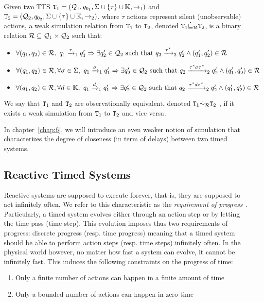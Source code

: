 \begin{definition}\label{def:wsim}
  Given two TTS $\texttt{T}_{1}=(\mathcal{Q}_{1},q_{0_{1}},\Sigma \cup\{\tau\}\cup\mathbb{K},\to_{1})$ and $\texttt{T}_{2}=(\mathcal{Q}_{2},q_{0_{2}},\Sigma \cup\{\tau\}\cup\mathbb{K},\to_{2})$, where $\tau$ actions 
  represent silent (unobservable) actions, a weak simulation relation from 
  $\texttt{T}_{1}$ to $\texttt{T}_{2}$, denoted $\texttt{T}_{1}\dot{\sqsubseteq}_{\mathcal{R}}\texttt{T}_{2}$, 
  is a binary relation $\mathcal{R}\subseteq\mathcal{Q}_1
  \times\mathcal{Q}_2$ such that:
  \begin{itemize}
    \item $\forall(q_1,q_2)\in\mc{R},\ 
      q_1\transitb{\tau}{1}q_1'\Rightarrow\exists q'_2\in\mc{Q}_2 
      \text{ such that } q_2\transitb{\tau^*}{2}q_2'\wedge
      (q_1',q_2')\in\mc{R}$
    \item $\forall(q_1,q_2)\in\mc{R},\forall\sigma\in\Sigma,\ 
      q_1\transitb{\sigma}{1}q_1'\Rightarrow\exists q'_2\in\mc{Q}_2 
      \text{ such that } q_2\transitb{\tau^*\sigma\tau^*}{2}q_2'\wedge
      (q_1',q_2')\in\mc{R}$
    \item $\forall(q_1,q_2)\in\mc{R},\forall d\in\mb{K},\ 
      q_1\transitb{d}{1}q_1'\Rightarrow\exists q'_2\in\mc{Q}_2 
      \text{ such that } q_2\transitb{\tau^*d\tau^*}{2}q_2'\wedge
      (q_1',q_2')\in\mc{R}$
  \end{itemize}
\end{definition}
  We say that $\texttt{T}_{1}$ and $\texttt{T}_{2}$ are observationally equivalent,
  denoted $\texttt{T}_{1}\dot{\sim}_{\mathcal{R}}\texttt{T}_{2}$ , if it exists a weak simulation 
  from $\texttt{T}_{1}$ to $\texttt{T}_{2}$ and vice versa.
  
  In chapter~\ref{chap:6}, we will introduce an even weaker notion of simulation 
  that characterizes the degree of closeness (in term of delays)
  between two timed systems. 

\subsection{Reactive Timed Systems}
Reactive systems are supposed to execute forever, that is,
they are supposed to act infinitely often. We refer to this characteristic as 
the \emph{requirement of progress}~\cite{progress}. 
Particularly, a timed system evolves either through an action step or 
by letting the time pass (time step).
This evolution imposes thus two requirements of progress:
discrete progress (resp. time progress) meaning that a timed system
should be able to perform action steps (resp. time steps) infinitely
often. In the physical world however, no matter how fast a system can
evolve, it cannot be infinitely fast. This induces the following constraints
on the progress of time:
\begin{enumerate}
  \item Only a finite number of actions can happen in a finite amount of time
  \item Only a bounded number of actions can happen in zero time
\end{enumerate}

